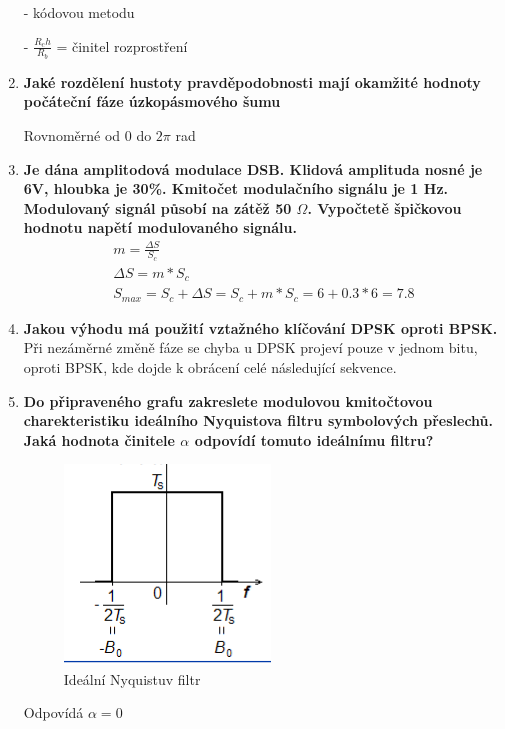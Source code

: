 \begin{enumerate}
    - kódovou metodu
    
    - $\frac{R_ch}{R_b}$ = činitel rozprostření
    \item \textbf{Jaké rozdělení hustoty pravděpodobnosti mají okamžité hodnoty počáteční fáze úzkopásmového šumu}

    Rovnoměrné od 0 do $2\pi$ rad

    \item \textbf{Je dána amplitodová modulace DSB. Klidová amplituda nosné je 6V, hloubka je 30\%. Kmitočet modulačního signálu je 1 Hz. Modulovaný signál působí na zátěž 50 $\Omega$. Vypočtetě špičkovou hodnotu napětí modulovaného signálu. }
    \begin{gather*}
        m=\frac{\Delta S}{S_c} \\
        \Delta S =m*S_c \\
        S_{max}=S_c+\Delta S=S_c+m*S_c=6+0.3*6=7.8 
    \end{gather*}

    \item \textbf{Jakou výhodu má použití vztažného klíčování DPSK oproti BPSK.}
    Při nezáměrné změně fáze se chyba u DPSK projeví pouze v jednom bitu, oproti BPSK, kde dojde k obrácení celé následující sekvence.
    \item \textbf{Do připraveného grafu zakreslete modulovou kmitočtovou charekteristiku ideálního Nyquistova filtru symbolových přeslechů. Jaká hodnota činitele $\alpha$ odpovídí tomuto ideálnímu filtru?}
    \begin{figure}[h!]
        \centering
        \includegraphics{images/NyqIdeal.png}
        \caption{Ideální Nyquistuv filtr}
        \label{fig:enter-label}
    \end{figure}
    Odpovídá $\alpha=0$
\end{enumerate}
